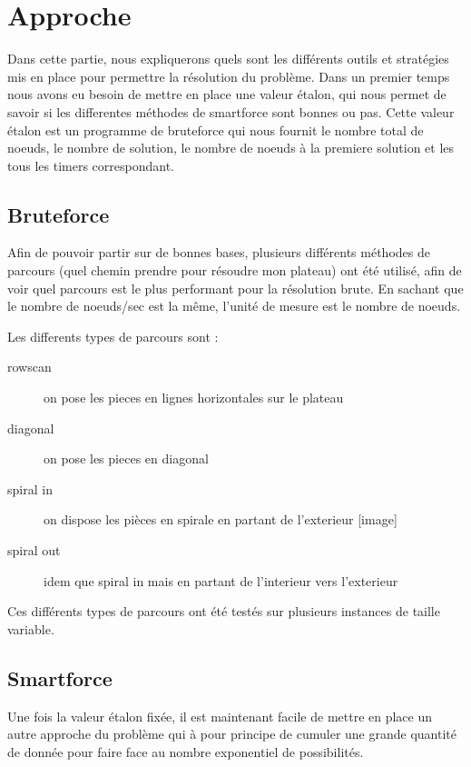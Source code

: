 \documentclass{article}
\begin{document}
	\section{Approche}

	Dans cette partie, nous expliquerons quels sont les différents outils et stratégies mis en place pour permettre la résolution du problème.
	Dans un premier temps nous avons eu besoin de mettre en place une valeur étalon, qui nous permet de savoir si les differentes méthodes de smartforce sont bonnes ou pas. Cette valeur étalon est un programme de bruteforce qui nous fournit le nombre total de noeuds, le nombre de solution, le nombre de noeuds à la premiere solution et les tous les timers correspondant.

	\subsection{Bruteforce}

	Afin de pouvoir partir sur de bonnes bases, plusieurs différents méthodes de parcours (quel chemin prendre pour résoudre mon plateau) ont été utilisé, afin de voir quel parcours est le plus performant pour la résolution brute. En sachant que le nombre de noeuds/sec est la même, l'unité de mesure est le nombre de noeuds.

	Les differents types de parcours sont :

	\begin{description}
		\item[rowscan] on pose les pieces en lignes horizontales sur le plateau
		\item[diagonal] on pose les pieces en diagonal
		\item[spiral in] on dispose les pièces en spirale en partant de l'exterieur [image]
		\item[spiral out] idem que spiral in mais en partant de l'interieur vers l'exterieur
	\end{description}

	Ces différents types de parcours ont été testés sur plusieurs instances de taille variable.

	\subsection{Smartforce}

	Une fois la valeur étalon fixée, il est maintenant facile de mettre en place un autre approche du problème qui à pour principe de cumuler une grande quantité de donnée pour faire face au nombre exponentiel de possibilités.
\end{document}
